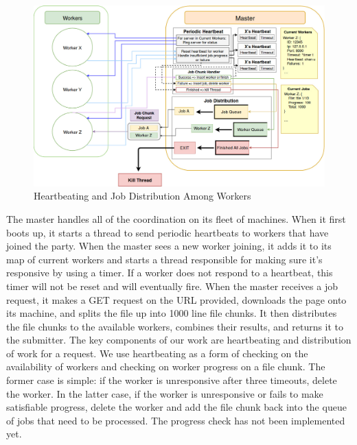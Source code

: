 \documentclass[twoside]{article}
\begin{document}
\begin{figure}[h]
\includegraphics[width=\textwidth]{distribution}
    \caption{Heartbeating and Job Distribution Among Workers}
    \label{fig:arch}
\end{figure}

The master handles all of the coordination on its fleet of machines. When it first boots up, it starts a thread to send periodic heartbeats to workers that have joined the party. When the master sees a new worker joining, it adds it to its map of current workers and starts a thread responsible for making sure it's responsive by using a timer. If a worker does not respond to a heartbeat, this timer will not be reset and will eventually fire. When the master receives a job
request, it makes a GET request on the URL provided, downloads the page onto its machine, and splits the file up into 1000 line file chunks. It then distributes the file chunks to the available workers, combines their results, and returns it to the submitter. 
The key components of our work are heartbeating and distribution of work for a request. We use heartbeating as a form of checking on the availability of workers and checking on worker progress on a file chunk. The former case is simple: if the worker is unresponsive after three timeouts, delete the worker. In the latter case, if the worker is unresponsive or fails to make satisfiable progress, delete the worker and add the file chunk back into the queue of jobs that need to be processed.
The progress check has not been implemented yet. 
\\
\end{document}

